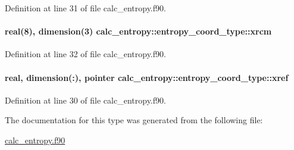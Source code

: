 Definition at line 31 of file calc\-\_\-entropy.\-f90.

\hypertarget{structcalc__entropy_1_1entropy__coord__type_acdc087704040a17ff0eec2e96dc00ad0}{
\paragraph[{xrcm}]{\setlength{\rightskip}{0pt plus 5cm}real(8), dimension(3) calc\-\_\-entropy\-::entropy\-\_\-coord\-\_\-type\-::xrcm}}\label{structcalc__entropy_1_1entropy__coord__type_acdc087704040a17ff0eec2e96dc00ad0}


Definition at line 32 of file calc\-\_\-entropy.\-f90.

\hypertarget{structcalc__entropy_1_1entropy__coord__type_af8dd0a14d5d570b4884947c9fb9e7855}{
\paragraph[{xref}]{\setlength{\rightskip}{0pt plus 5cm}real, dimension(\-:), pointer calc\-\_\-entropy\-::entropy\-\_\-coord\-\_\-type\-::xref}}\label{structcalc__entropy_1_1entropy__coord__type_af8dd0a14d5d570b4884947c9fb9e7855}


Definition at line 30 of file calc\-\_\-entropy.\-f90.



The documentation for this type was generated from the following file\-:\begin{DoxyCompactItemize}
\item 
\hyperlink{calc__entropy_8f90}{calc\-\_\-entropy.\-f90}\end{DoxyCompactItemize}
